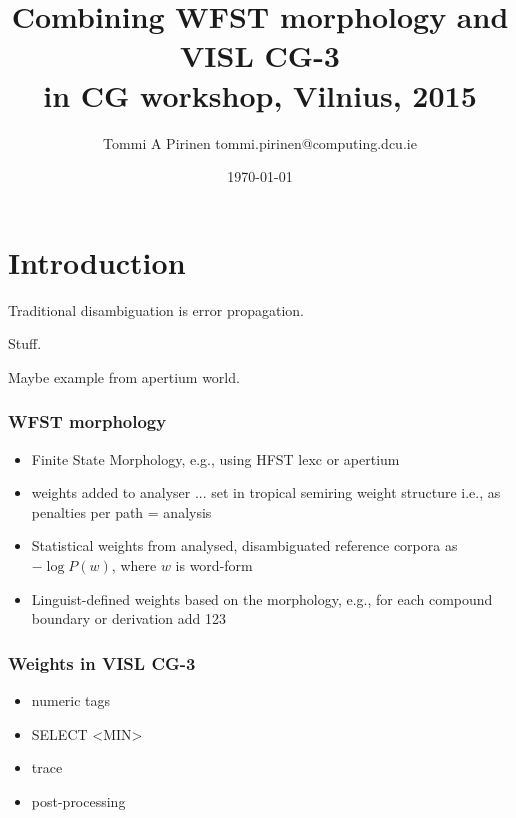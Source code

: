 \documentclass{beamer}
\title{Combining WFST morphology and VISL CG-3\\
\scriptsize{in CG workshop, Vilnius, 2015}}
\author{Tommi A Pirinen \scriptsize \guilsinglleft{}tommi.pirinen@computing.dcu.ie\guilsinglright{}}
\institute{DCU, ADAPT--CNGL\\Abumatran}
\date{\today}
\begin{document}

\maketitle

\section{Introduction}

\begin{frame}
Traditional disambiguation is error propagation.

Stuff.

Maybe example from apertium world.
\end{frame}

\begin{frame}
    \frametitle{WFST morphology}
    \begin{itemize}
        \item Finite State Morphology, e.g., using HFST lexc or apertium
        \item weights added to analyser ... 
            set in tropical semiring weight structure i.e., as penalties
            per path = analysis
        \item Statistical weights from analysed, disambiguated reference
            corpora as $-\log P(w)$, where $w$ is word-form
        \item Linguist-defined weights based on the morphology, e.g.,
            for each compound boundary or derivation add 123
    \end{itemize}
\end{frame}

\begin{frame}
    \frametitle{Weights in VISL CG-3}
    \begin{itemize}
        \item numeric tags
        \item SELECT <MIN>
        \item trace
        \item post-processing
    \end{itemize}
\end{frame}
\end{document}
